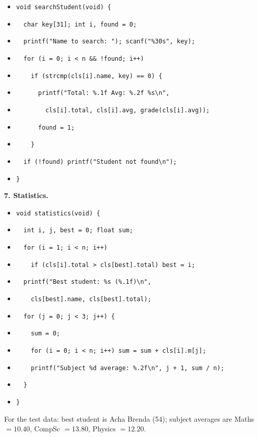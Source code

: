 \documentclass[11pt]{article}
\begin{document}
\begin{itemize}
\item \texttt{void searchStudent(void) \{}
\item \texttt{\ \ char key[31]; int i, found = 0;}
\item \texttt{\ \ printf("Name to search: "); scanf("\%30s", key);}
\item \texttt{\ \ for (i = 0; i < n \&\& !found; i++)}
\item \texttt{\ \ \ \ if (strcmp(cls[i].name, key) == 0) \{}
\item \texttt{\ \ \ \ \ \ printf("Total: \%.1f  Avg: \%.2f  \%s\textbackslash{}n",}
\item \texttt{\ \ \ \ \ \ \ \ cls[i].total, cls[i].avg, grade(cls[i].avg));}
\item \texttt{\ \ \ \ \ \ found = 1;}
\item \texttt{\ \ \ \ \}}
\item \texttt{\ \ if (!found) printf("Student not found\textbackslash{}n");}
\item \texttt{\}}
\end{itemize}

\textbf{7. Statistics.}

\begin{itemize}
\item \texttt{void statistics(void) \{}
\item \texttt{\ \ int i, j, best = 0; float sum;}
\item \texttt{\ \ for (i = 1; i < n; i++)}
\item \texttt{\ \ \ \ if (cls[i].total > cls[best].total) best = i;}
\item \texttt{\ \ printf("Best student: \%s (\%.1f)\textbackslash{}n",}
\item \texttt{\ \ \ \ cls[best].name, cls[best].total);}
\item \texttt{\ \ for (j = 0; j < 3; j++) \{}
\item \texttt{\ \ \ \ sum = 0;}
\item \texttt{\ \ \ \ for (i = 0; i < n; i++) sum = sum + cls[i].m[j];}
\item \texttt{\ \ \ \ printf("Subject \%d average: \%.2f\textbackslash{}n", j + 1, sum / n);}
\item \texttt{\ \ \}}
\item \texttt{\}}
\end{itemize}

For the test data: best student is Acha Brenda (54); subject averages are Maths $= 10.40$, CompSc $= 13.80$, Physics $= 12.20$.
\end{document}

